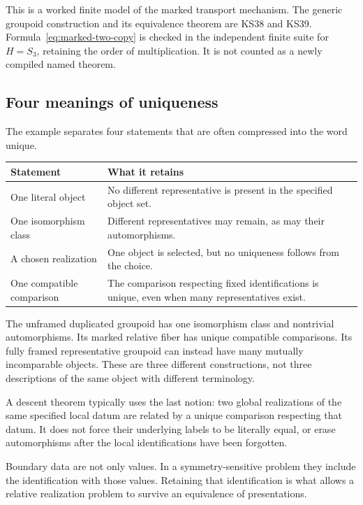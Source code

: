 This is a worked finite model of the marked transport mechanism. The generic groupoid construction and its equivalence theorem are KS38 and KS39. Formula~\eqref{eq:marked-two-copy} is checked in the independent finite suite for \(H=S_3\), retaining the order of multiplication. It is not counted as a newly compiled named theorem.

\subsection{Four meanings of uniqueness}
The example separates four statements that are often compressed into the word unique.
\begin{center}
\begin{tabularx}{\linewidth}{@{}p{.28\linewidth}X@{}}
\toprule
Statement & What it retains\\
\midrule
One literal object & No different representative is present in the specified object set.\\
One isomorphism class & Different representatives may remain, as may their automorphisms.\\
A chosen realization & One object is selected, but no uniqueness follows from the choice.\\
One compatible comparison & The comparison respecting fixed identifications is unique, even when many representatives exist.\\
\bottomrule
\end{tabularx}
\end{center}
The unframed duplicated groupoid has one isomorphism class and nontrivial automorphisms. Its marked relative fiber has unique compatible comparisons. Its fully framed representative groupoid can instead have many mutually incomparable objects. These are three different constructions, not three descriptions of the same object with different terminology.

A descent theorem typically uses the last notion: two global realizations of the same specified local datum are related by a unique comparison respecting that datum. It does not force their underlying labels to be literally equal, or erase automorphisms after the local identifications have been forgotten.

\begin{insight}
Boundary data are not only values. In a symmetry-sensitive problem they include the identification with those values. Retaining that identification is what allows a relative realization problem to survive an equivalence of presentations.
\end{insight}
